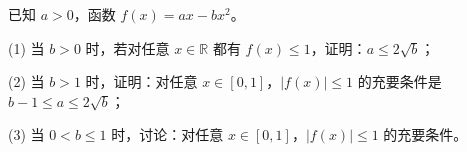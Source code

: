 \begin{question}
已知 $a>0$，函数 $f(x)=ax-bx^2$。

(1) 当 $b>0$ 时，若对任意 $x\in\mathbb R$ 都有 $f(x)\leqslant1$，证明：$a\leqslant2\sqrt b$；

(2) 当 $b>1$ 时，证明：对任意 $x\in[0,1]$，$|f(x)|\leqslant1$ 的充要条件是 $b-1\leqslant a\leqslant2\sqrt b$；

(3) 当 $0<b\leqslant1$ 时，讨论：对任意 $x\in[0,1]$，$|f(x)|\leqslant1$ 的充要条件。

\end{question}